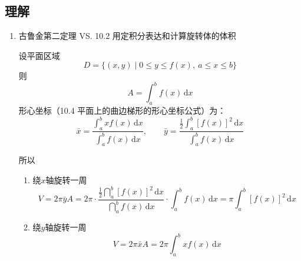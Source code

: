 \documentclass[../book.tex]{subfiles}
\begin{document}
    \subsection{理解}

    \begin{enumerate}
        \item 古鲁金第二定理 VS. 10.2 用定积分表达和计算旋转体的体积
        \begin{analysisbox}
            设平面区域
            \[
                D = \{(x, y) \mid 0 \le y \le f(x),\ a \le x \le b\}
            \]
            则
            \[
                A = \int_a^b f(x)\,\mathrm{d}x
            \]
            形心坐标（10.4 平面上的曲边梯形的形心坐标公式）为：
            \[
                \bar{x} = \frac{\displaystyle\int_a^b x f(x)\,\mathrm{d}x}{\displaystyle\int_a^b f(x)\,\mathrm{d}x},
                \qquad
                \bar{y} = \frac{\displaystyle\frac12\int_a^b [f(x)]^2\,\mathrm{d}x}{\displaystyle\int_a^b f(x)\,\mathrm{d}x}
            \]

            所以
            \begin{enumerate}
                \item 绕$x$轴旋转一周
                \[
                    V = 2\pi \bar{y}A = 2\pi \cdot \frac{\frac12\dint_a^b [f(x)]^2\,\mathrm{d}x}{\dint_a^b f(x)\,\mathrm{d}x}\cdot \int_a^b f(x)\,\mathrm{d}x = \pi\int_a^b [f(x)]^2\,\mathrm{d}x
                \]
                \item 绕$y$轴旋转一周
                \[
                    V = 2\pi \bar{x}A = 2\pi \int_a^b x f(x)\,\mathrm{d}x
                \]
            \end{enumerate}

        \end{analysisbox}
    \end{enumerate}
\end{document}
